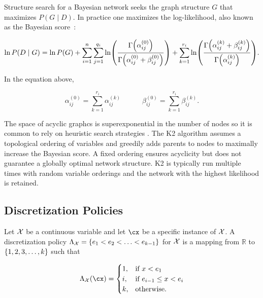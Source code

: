 Structure search for a Bayesian network seeks the graph structure $G$ that maximizes ${P(G\mid D)}$.
In practice one maximizes the log-likelihood, also known as the Bayesian score~\cite{cooper1992bayesian}:

\begin{small}
\begin{equation}
\label{eq:BayesianScore}
  \ln P(D\mid G) = \ln P(G) + \sum_{i=1}^n \sum_{j=1}^{q_i} \ln \paren{
    \frac{
      \Gamma\paren{\alpha_{ij}^{(0)}}
    }{
      \Gamma\paren{\alpha_{ij}^{(0)} + \beta_{ij}^{(0)}}
    }
  } + \sum_{k=1}^{r_i} \ln \paren{
    \frac{
      \Gamma\paren{\alpha_{ij}^{(k)} + \beta_{ij}^{(k)}}
    }{
      \Gamma\paren{\alpha_{ij}^{(k)}}
    }
  }\text{.}
\end{equation}
\end{small}

In the equation above,

\begin{equation}
\alpha_{ij}^{(0)} = \sum_{k=1}^{r_i} \alpha_{ij}^{(k)} \quad \qquad \beta_{ij}^{(0)} = \sum_{k=1}^{r_i} \beta_{ij}^{(k)}\text{.}
\end{equation}

The space of acyclic graphcs is superexponential in the number of nodes so it is common to rely on heuristic search strategies \citep{PGM_2009}.
The K2 algorithm assumes a topological ordering of variables and greedily adds parents to nodes to maximally increase the Bayesian score.
A fixed ordering ensures acyclicity but does not guarantee a globally optimal network structure.
K2 is typically run multiple times with random variable orderings and the network with the highest likelihood is retained.

\subsection{Discretization Policies}
\label{subsec:disc_policy}

Let $\mathcal{X}$ be a continuous variable and let $\cx$ be a specific instance of $\mathcal{X}$.
A discretization policy $\Lambda_{\cX} = \curly{e_1 < e_2 < \ldots < e_{k-1}}$ for $\mathcal{X}$ is a mapping from $\mathbb{R}$ to $\curly{1,2,3,\ldots,k}$ such that

\begin{equation}
  \Lambda_{\cX}(\cx) = \begin{cases}
    1, & \text{if $x<e_1$}\\
    i, & \text{if $e_{i-1} \leq x < e_i$}\\
    k, & \text{otherwise.}
  \end{cases}
\end{equation}


